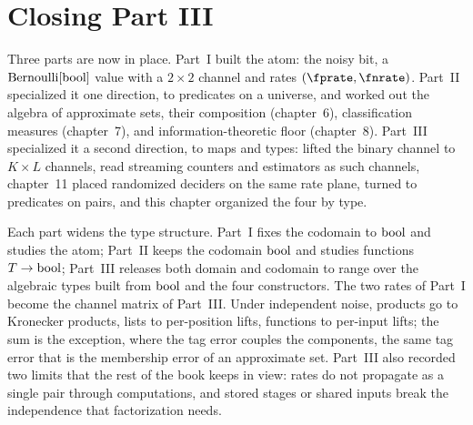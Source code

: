 %

\section{Closing Part III}
\label{sec:closing-part3}

Three parts are now in place. Part~I built the atom: the noisy bit, a
$\mathrm{Bernoulli}[\mathrm{bool}]$ value with a $2 \times 2$ channel and rates
$(\fprate, \fnrate)$. Part~II specialized it one direction, to predicates on a universe, and
worked out the algebra of approximate sets, their composition (chapter~6),
classification measures (chapter~7), and information-theoretic floor (chapter~8).
Part~III specialized it a second direction, to maps and types:
 lifted the binary channel to $K \times L$
channels,  read streaming counters and estimators
as such channels, chapter~11 placed randomized deciders on the same rate plane,
 turned to predicates on pairs, and this chapter
organized the four by type.

Each part widens the type structure. Part~I fixes the codomain to $\mathrm{bool}$ and
studies the atom; Part~II keeps the codomain $\mathrm{bool}$ and studies functions
$T \to \mathrm{bool}$; Part~III releases both domain and codomain to range over the
algebraic types built from $\mathrm{bool}$ and the four constructors. The two rates
of Part~I become the channel matrix of Part~III. Under independent noise,
products go to Kronecker products, lists to per-position lifts, functions to
per-input lifts; the sum is the exception, where the tag error couples the
components, the same tag error that is the membership error of an approximate
set. Part~III also recorded two limits that the rest of the book keeps in view:
rates do not propagate as a single pair through computations, and stored stages
or shared inputs break the independence that factorization needs.

